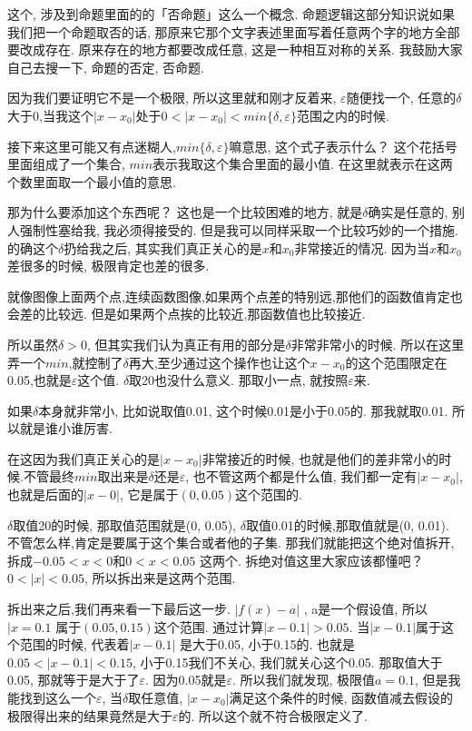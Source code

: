 这个, 涉及到命题里面的的「否命题」这么一个概念. 命题逻辑这部分知识说如果我们把一个命题取否的话, 那原来它那个文字表述里面写着任意两个字的地方全部要改成存在. 原来存在的地方都要改成任意, 这是一种相互对称的关系. 我鼓励大家自己去搜一下, 命题的否定, 否命题. 

因为我们要证明它不是一个极限, 所以这里就和刚才反着来, $\varepsilon$随便找一个, 任意的$\delta$大于0,当我这个$|x-x_0|$处于$ 0< |x-x_0| < min\{\delta, \varepsilon \}$范围之内的时候. 

接下来这里可能又有点迷糊人,$min\{\delta, \varepsilon\}$嘛意思, 这个式子表示什么？ 这个花括号里面组成了一个集合, $min$表示我取这个集合里面的最小值. 在这里就表示在这两个数里面取一个最小值的意思. 

那为什么要添加这个东西呢？ 这也是一个比较困难的地方, 就是$\delta$确实是任意的, 别人强制性塞给我, 我必须得接受的. 但是我可以同样采取一个比较巧妙的一个措施. 的确这个$\delta$扔给我之后, 其实我们真正关心的是$x$和$x_0$非常接近的情况. 因为当$x$和$x_0$差很多的时候, 极限肯定也差的很多. 

就像图像上面两个点,连续函数图像,如果两个点差的特别远,那他们的函数值肯定也会差的比较远. 但是如果两个点挨的比较近,那函数值也比较接近. 

所以虽然$\delta > 0$, 但其实我们认为真正有用的部分是$\delta$非常非常小的时候. 所以在这里弄一个$min$,就控制了$\delta$再大,至少通过这个操作也让这个$x-x_0$的这个范围限定在0.05,也就是$\varepsilon$这个值. $\delta$取20也没什么意义. 那取小一点, 就按照$\varepsilon$来. 

如果$\delta$本身就非常小, 比如说取值0.01, 这个时候0.01是小于0.05的. 那我就取0.01. 所以就是谁小谁厉害. 

在这因为我们真正关心的是$|x-x_0|$非常接近的时候, 也就是他们的差非常小的时候.不管最终$min$取出来是$\delta$还是$\varepsilon$, 也不管这两个都是什么值, 我们都一定有$|x-x_0|$, 也就是后面的$|x-0|$, 它是属于$(0, 0.05)$这个范围的. 

$\delta$取值20的时候, 那取值范围就是(0, 0.05), $\delta$取值0.01的时候,那取值就是(0, 0.01). 不管怎么样,肯定是要属于这个集合或者他的子集. 那我们就能把这个绝对值拆开, 拆成$-0.05 < x <  0$和$0<x<0.05$ 这两个. 拆绝对值这里大家应该都懂吧？ $0< |x| < 0.05$, 所以拆出来是这两个范围. 

拆出来之后,我们再来看一下最后这一步. $|f(x)-a|$ , a是一个假设值, 所以$|x=0.1$ 属于$(0.05, 0.15)$这个范围. 通过计算$|x-0.1| > 0.05$. 当$|x-0.1|$属于这个范围的时候, 代表着$|x-0.1|$ 是大于0.05, 小于0.15的. 也就是$0.05 < |x-0.1| < 0.15$, 小于0.15我们不关心, 我们就关心这个0.05. 那取值大于0.05, 那就等于是大于了$\varepsilon$. 因为0.05就是$\varepsilon$. 所以我们就发现, 极限值$a=0.1$, 但是我能找到这么一个$\varepsilon$, 当$\delta$取任意值, $|x-x_0|$满足这个条件的时候,  函数值减去假设的极限得出来的结果竟然是大于$\varepsilon$的. 所以这个就不符合极限定义了. 

